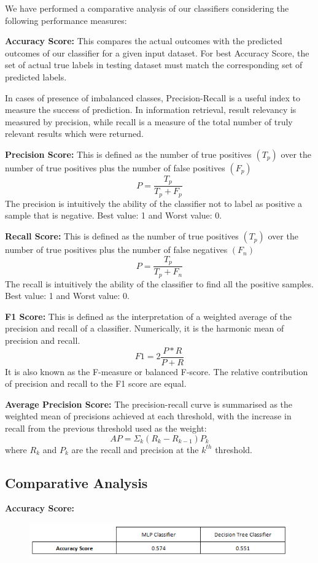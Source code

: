 \documentclass[a4paper, 10pt, conference]{IEEEtran}
\begin{document}
We have performed a comparative analysis of our classifiers considering the following performance measures: 

\textbf{Accuracy Score:}
 This compares the actual outcomes with the predicted outcomes of our classifier for a given input dataset. For best Accuracy Score, the set of actual true labels in testing dataset must match the corresponding set of predicted labels.

In cases of presence of imbalanced classes, Precision-Recall is a useful index to measure the success of prediction. In information retrieval, result relevancy is measured by precision, while recall is a measure of the total number of truly relevant results which were returned.

\textbf{Precision Score:}
This is defined as the number of true positives $(T_{p})$ over the number of true positives plus the number of false positives $(F_{p})$
\[ P = \frac{T_{p}}{T_{p}+F_{p}}\]
The precision is intuitively the ability of the classifier not to label as positive a sample that is negative. Best value: 1 and Worst value: 0. 

\textbf{Recall Score:}
This is defined as the number of true positives $(T_{p})$ over the number of true positives plus the number of false negatives $(F_{n})$
\[ P = \frac{T_{p}}{T_{p}+F_{n}}\]
The recall is intuitively the ability of the classifier to find all the positive samples. Best value: 1 and Worst value: 0.

\textbf{F1 Score:}
This is defined as the interpretation of a weighted average of the precision and recall of a classifier. Numerically, it is the harmonic mean of precision and recall.
\[ F1 = 2 \frac{P*R}{P+R}
\]
It is also known as the F-measure or balanced F-score. The relative contribution of precision and recall to the F1 score are equal.

\textbf{Average Precision Score:}
The precision-recall curve is summarised as the weighted mean of precisions achieved at each threshold, with the increase in recall from the previous threshold used as the weight:
\[ AP = \Sigma_{k}(R_{k}-R_{k-1})P_{k}\]
where \textit{$R_{k}$} and \textit{$P_{k}$} are the recall and precision at the \textit{$k^{th}$} threshold.

\subsection{Comparative Analysis}
\textbf{Accuracy Score:}
\begin{figure}[h!]
  \includegraphics[width=\linewidth]{ModelScore.png}
  \label{fig:scoremodel}
\end{figure}
\end{document}
